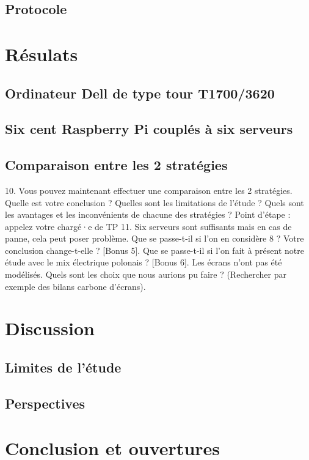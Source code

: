 \documentclass[12pt,a4paper]{paper}
\begin{document}
\subsection{Protocole}
\noindent \lipsum[1-2]


\section{Résulats}
\subsection{Ordinateur Dell de type tour T1700/3620}
\noindent \lipsum[1-2]

\subsection{Six cent Raspberry Pi couplés à six serveurs}
\noindent \lipsum[1-2]

\subsection{Comparaison entre les 2 stratégies}
10. Vous pouvez maintenant effectuer une comparaison entre les 2 stratégies. Quelle est votre
conclusion ? Quelles sont les limitations de l’étude ? Quels sont les avantages et les inconvénients
de chacune des stratégies ?
Point d’étape : appelez votre chargé·e de TP
11. Six serveurs sont suffisants mais en cas de panne, cela peut poser problème. Que se passe-t-il
si l’on en considère 8 ? Votre conclusion change-t-elle ?
[Bonus 5]. Que se passe-t-il si l’on fait à présent notre étude avec le mix électrique polonais ?
[Bonus 6]. Les écrans n’ont pas été modélisés. Quels sont les choix que nous aurions pu faire ?
(Rechercher par exemple des bilans carbone d’écrans).

\section{Discussion}
\noindent \lipsum[1-2]
\subsection{Limites de l'étude}
\noindent \lipsum[1-2]
\subsection{Perspectives}
\noindent \lipsum[1-2]


\section{Conclusion et ouvertures}
\noindent \noindent \lipsum[1-2]
% 

\printbibliography
{}
% 

\appendix
\end{document}
